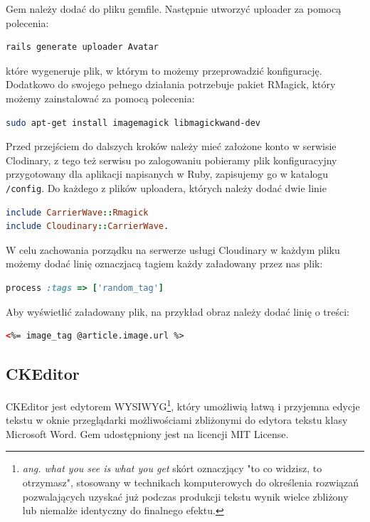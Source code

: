 \documentclass[openright]{xmgr}
\begin{document}
Gem należy dodać do pliku gemfile. Następnie utworzyć uploader za pomocą polecenia: 
\begin{lstlisting}[language=bash]
rails generate uploader Avatar
\end{lstlisting}
które wygeneruje plik, w którym to możemy przeprowadzić konfigurację. Dodatkowo do swojego pełnego działania potrzebuje pakiet RMagick, który możemy zainstalować za pomocą polecenia: 
\begin{lstlisting}[language=bash, caption={Polecenie instalujące oprogramowanie RMagick}]
sudo apt-get install imagemagick libmagickwand-dev
\end{lstlisting}
Przed przejściem do dalszych kroków należy mieć założone konto w serwisie Clodinary, z tego też serwisu po zalogowaniu pobieramy plik konfiguracyjny przygotowany dla aplikacji napisanych w Ruby, zapisujemy go w katalogu \texttt{/config}. Do każdego z plików uploadera, których należy dodać dwie linie 
\begin{lstlisting}[language=ruby, caption={Framgent zawartości pliku uploadera}]
include CarrierWave::Rmagick
include Cloudinary::CarrierWave.
\end{lstlisting}

\newpage

W celu zachowania porządku na serwerze usługi Cloudinary w każdym pliku możemy dodać linię oznaczjacą tagiem każdy załadowany przez nas plik: 
\begin{lstlisting}[language=ruby, caption={Przykładowy tag dla pliku}]
process :tags => ['random_tag']
\end{lstlisting}
Aby wyświetlić załadowany plik, na przykład obraz należy dodać linię o treści: 
\begin{lstlisting}[language=html, caption={Kod wyświetlający obraz}]
<%= image_tag @article.image.url %>
\end{lstlisting}

\subsection{CKEditor}
CKEditor \cite{ckeditor} jest edytorem WYSIWYG\footnote{\textit{ang. what you see is what you get} skórt oznaczjący "to co widzisz, to otrzymasz", stosowany w technikach komputerowych do określenia rozwiązań pozwalających uzyskać już podczas produkcji tekstu wynik wielce zbliżony lub niemalże identyczny do finalnego efektu.}, który umożliwią łatwą i przyjemna edycje tekstu w oknie przeglądarki możliwościami zbliżonymi do edytora tekstu klasy Microsoft Word. Gem udostępniony jest na licencji MIT License. 
\end{document}
